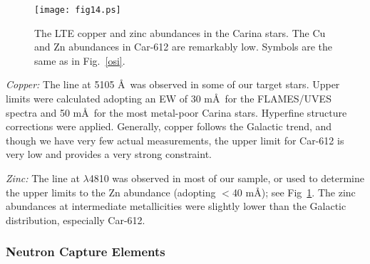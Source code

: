 \documentclass{emulateapj}
\newcommand\etal{{\rm et al.\,}}
\begin{document}


\begin{figure}[t]
\texttt{[image: fig14.ps]}
\caption{The LTE copper and zinc abundances in the Carina stars.
The Cu and Zn abundances in Car-612 are remarkably low.
Symbols are the same as in Fig.~\ref{osi}.  \\
}
\label{cuzn}
\end{figure}


{\it Copper:}
The  line at 5105 \AA\ was observed in some of our target stars.
Upper limits were calculated adopting an EW of 30 m\AA\ for
the FLAMES/UVES spectra and 50 m\AA\ for the most metal-poor Carina stars.
Hyperfine structure corrections were applied.
Generally, copper follows the Galactic trend, and though we have very
few actual measurements, the upper limit for Car-612 is very low and
provides a very strong constraint.

{\it Zinc:}
The  line at $\lambda$4810 was observed in most of our 
sample, or used to determine the upper limits to the Zn abundance 
(adopting $<$40 m\AA); see Fig~\ref{cuzn}.    
The zinc abundances at intermediate metallicities were slightly lower 
than the Galactic distribution, especially Car-612.   
 


\subsubsection {Neutron Capture Elements \label{heavy}}
\end{document}
